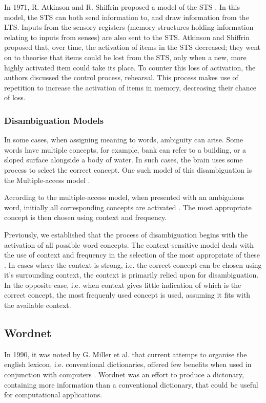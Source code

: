 \documentclass[]{article}
\begin{document}
In 1971, R. Atkinson and R. Shiffrin proposed a model of the STS \cite{ControlProcessesSTMAtkinson}. In this model, the STS can both send information to, and draw information from the LTS. Inputs from the sensory registers (memory structures holding information relating to inputs from senses) are also sent to the STS. Atkinson and Shiffrin proposed that, over time, the activation of items in the STS decreased; they went on to theorise that items could be lost from the STS, only when a new, more highly activated item could take its place. To counter this loss of activation, the authors discussed the control process, rehearsal. This process makes use of repetition to increase the activation of items in memory, decreasing their chance of loss. 


\subsubsection{Disambiguation Models}
\label{sec:DisambiguationModels}
In some cases, when assigning meaning to words, ambiguity can arise. Some words have multiple concepts, for example, bank can refer to a building, or a sloped surface alongside a body of water. In such cases, the brain uses some process to select the correct concept. One such model of this disambiguation is the Multiple-access model \cite{PsychologyOfLanguage}.

According to the multiple-access model, when presented with an ambiguious word, initially all corresponding concepts are activated \cite{AccessingLexicalAmbiguities}. The most appropriate concept is then chosen using context and frequency.

Previously, we established that the process of disambiguation begins with the activation of all possible word concepts. The context-sensitive model deals with the use of context and frequency in the selection of the most appropriate of these \cite{PsychologyOfLanguage}. In cases where the context is strong, i.e. the correct concept can be chosen using it's surrounding context, the context is primarily relied upon for disambiguation. In the opposite case, i.e. when context gives little indication of which is the correct concept, the most frequenly used concept is used, assuming it fits with the available context.


\subsection{Wordnet}
\label{Wordnet}
In 1990, it was noted by G. Miller et al. that current attemps to organise the english lexicon, i.e. conventional dictionaries, offered few benefits when used in conjunction with computers \cite{WN1Introduction}. Wordnet was an effort to produce a dictonary, containing more information than a conventional dictionary, that could be useful for computational applications.
\end{document}
